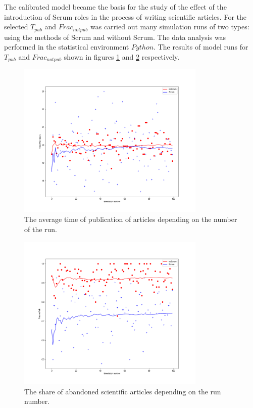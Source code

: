 \documentclass[12pt]{report}
\theoremstyle{definition}
\begin{document}
The calibrated model became the basis for the study of the effect of the introduction of Scrum roles in the process of writing scientific articles.
For the selected $T_{pub}$ and $Frac_{notpub}$ was carried out many simulation runs of two types: using the methods of Scrum and without Scrum. 
The data analysis was performed in the statistical environment $Python$.
The results of model runs  for $T_{pub}$ and $Frac_{notpub}$ shown in  figures \ref{ex:fig12} and \ref{ex:fig13} respectively.

\begin{figure}[ht]
	\centering
	\includegraphics[width=0.8\textwidth]{scrum-img12}
	\caption{ The average time of publication of articles depending on the number of the run.}
	\label{ex:fig12}
\end{figure}  

\begin{figure}[ht]
	\centering
	\includegraphics[width=0.8\textwidth]{scrum-img13}
	\caption{The share of abandoned scientific articles depending on the run number.}
	\label{ex:fig13}
\end{figure}  
\end{document}

